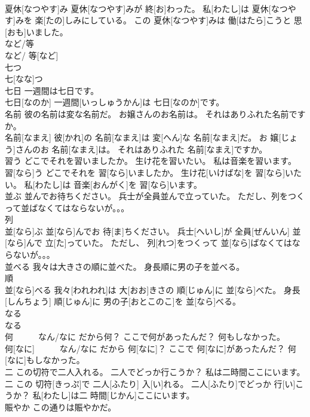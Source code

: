 \documentclass[8pt]{extreport}
\begin{document}
\begin{CJK}{UTF8}{min}
\\	夏休[なつやす]み 夏休[なつやす]みが 終[お]わった。 私[わたし]は 夏休[なつやす]みを 楽[たの]しみにしている。 この 夏休[なつやす]みは 働[はたら]こうと 思[おも]いました。
\\	など/等	
\\	など/ 等[など]
\\	七つ	
\\	七[なな]つ
\\	七日 一週間は七日です。	
\\	七日[なのか] 一週間[いっしゅうかん]は 七日[なのか]です。
\\	名前 彼の名前は変な名前だ。 お嬢さんのお名前は。 それはありふれた名前ですか。	
\\	名前[なまえ] 彼[かれ]の 名前[なまえ]は 変[へん]な 名前[なまえ]だ。 お 嬢[じょう]さんのお 名前[なまえ]は。 それはありふれた 名前[なまえ]ですか。
\\	習う どこでそれを習いましたか。 生け花を習いたい。 私は音楽を習います。	
\\	習[なら]う どこでそれを 習[なら]いましたか。 生け花[いけばな]を 習[なら]いたい。 私[わたし]は 音楽[おんがく]を 習[なら]います。
\\	並ぶ 並んでお待ちください。 兵士が全員並んで立っていた。 ただし、列をつくって並ばなくてはならないが。。。	
\\	列 
\\	並[なら]ぶ 並[なら]んでお 待[ま]ちください。 兵士[へいし]が 全員[ぜんいん] 並[なら]んで 立[た]っていた。 ただし、 列[れつ]をつくって 並[なら]ばなくてはならないが。。。
\\	並べる 我々は大きさの順に並べた。 身長順に男の子を並べる。	
\\	順 
\\	並[なら]べる 我々[われわれ]は 大[おお]きさの 順[じゅん]に 並[なら]べた。 身長[しんちょう] 順[じゅん]に 男の子[おとこのこ]を 並[なら]べる。
\\	なる	
\\	なる
\\	何　　　なん/なに だから何？ ここで何があったんだ？ 何もしなかった。	
\\	何[なに]　　　なん/なに だから 何[なに]？ ここで 何[なに]があったんだ？ 何[なに]もしなかった。
\\	二 この切符で二人入れる。 二人でどっか行こうか？ 私は二時間ここにいます。	
\\	二 この 切符[きっぷ]で 二人[ふたり] 入[い]れる。 二人[ふたり]でどっか 行[い]こうか？ 私[わたし]は二 時間[じかん]ここにいます。
\\	賑やか この通りは賑やかだ。	

\end{CJK}
\end{document}
